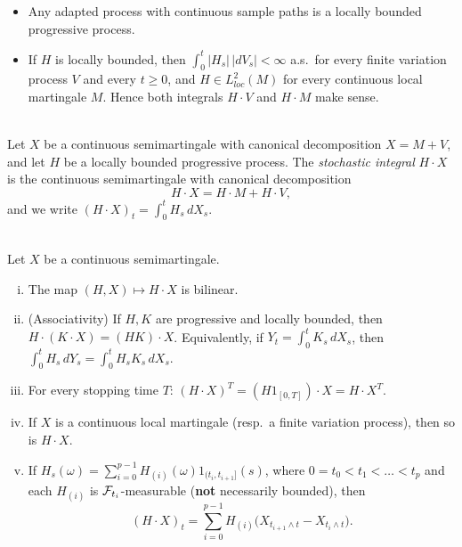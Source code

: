 \begin{remark}\label{chap5.1.3:remark-locally_bounded}
\begin{itemize}
    \item Any adapted process with continuous sample paths is a locally bounded progressive process.
    \item If $H$ is locally bounded, then $\int_0^t|H_s|\,|dV_s|<\infty$ a.s.\ for every finite variation process $V$ and every $t\geq 0$, and $H\in L^2_{loc}(M)$ for every continuous local martingale $M$. Hence both integrals $H\cdot V$ and $H\cdot M$ make sense.
\end{itemize}
\end{remark}

\begin{definition}\label{chap5.1.3:definition-stochastic_integral_semimartingale}
\\
Let $X$ be a continuous semimartingale with canonical decomposition $X=M+V$, and let $H$ be a locally bounded progressive process. The \textit{stochastic integral} $H\cdot X$ is the continuous semimartingale with canonical decomposition
$$H\cdot X = H\cdot M + H\cdot V,$$
and we write $(H\cdot X)_t=\int_0^t H_s\,dX_s$.
\end{definition}

\begin{proposition}\label{chap5.1.3:proposition-properties}
\\
Let $X$ be a continuous semimartingale.
\begin{enumerate}[(i)]
    \item The map $(H,X)\mapsto H\cdot X$ is bilinear.
    \item (Associativity) If $H,K$ are progressive and locally bounded, then $H\cdot(K\cdot X)=(HK)\cdot X$. Equivalently, if $Y_t=\int_0^t K_s\,dX_s$, then $\int_0^t H_s\,dY_s=\int_0^t H_sK_s\,dX_s$.
    \item For every stopping time $T$: $(H\cdot X)^T = (H1_{[0,T]})\cdot X = H\cdot X^T$.
    \item If $X$ is a continuous local martingale (resp.\ a finite variation process), then so is $H\cdot X$.
    \item If $H_s(\omega)=\sum_{i=0}^{p-1}H_{(i)}(\omega)1_{(t_i,t_{i+1}]}(s)$, where $0=t_0<t_1<\dots<t_p$ and each $H_{(i)}$ is $\mathcal{F}_{t_i}$-measurable (\textbf{not} necessarily bounded), then
    $$(H\cdot X)_t = \sum_{i=0}^{p-1}H_{(i)}\big(X_{t_{i+1}\wedge t}-X_{t_i\wedge t}\big).$$
\end{enumerate}
\end{proposition}

